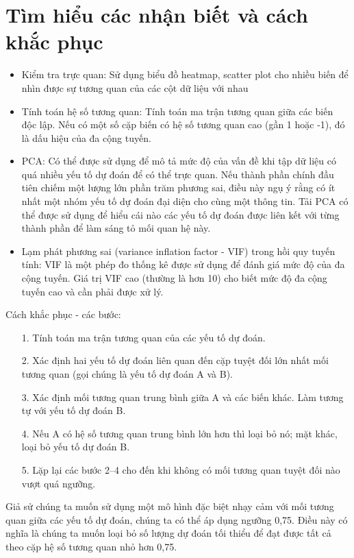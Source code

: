 \documentclass[12pt,a4papers]{article}
\begin{document}
\section{Tìm hiểu các nhận biết và cách khắc phục}
\begin{itemize}
    \item Kiểm tra trực quan: Sử dụng biểu đồ heatmap, scatter plot cho nhiều biến để nhìn được sự tương quan của các cột dữ liệu với nhau
    \item Tính toán hệ số tương quan: Tính toán ma trận tương quan giữa các biến độc lập. Nếu có một số cặp biến có hệ số tương quan cao (gần 1 hoặc -1), đó là dấu hiệu của đa cộng tuyến.
    \item PCA: Có thể được sử dụng để mô tả mức độ của vấn đề khi tập dữ liệu có quá nhiều yếu tố dự đoán để có thể trực quan. Nếu thành phần chính đầu tiên chiếm một lượng lớn phần trăm phương sai, điều này ngụ ý rằng có ít nhất một nhóm yếu tố dự đoán đại diện cho cùng một thông tin. Tải PCA có thể được sử dụng để hiểu cái nào
các yếu tố dự đoán được liên kết với từng thành phần để làm sáng tỏ mối quan hệ này.
    \item Lạm phát phương sai (variance inflation factor - VIF) trong hồi quy tuyến tính: VIF là một phép đo thống kê được sử dụng để đánh giá mức độ của đa cộng tuyến. Giá trị VIF cao (thường là hơn 10) cho biết mức độ đa cộng tuyến cao và cần phải được xử lý.
\end{itemize}

Cách khắc phục - các bước:
\begin{itemize}
    \item[1.] Tính toán ma trận tương quan của các yếu tố dự đoán.
    \item[2.] Xác định hai yếu tố dự đoán liên quan đến cặp tuyệt đối lớn nhất
mối tương quan (gọi chúng là yếu tố dự đoán A và B).
    \item[3.] Xác định mối tương quan trung bình giữa A và các biến khác.
Làm tương tự với yếu tố dự đoán B.
    \item[4.] Nếu A có hệ số tương quan trung bình lớn hơn thì loại bỏ nó; mặt khác, loại bỏ yếu tố dự đoán B.
    \item[5.] Lặp lại các bước 2–4 cho đến khi không có mối tương quan tuyệt đối nào vượt quá ngưỡng.
\end{itemize}

Giả sử chúng ta muốn sử dụng một mô hình đặc biệt nhạy cảm với mối tương quan giữa các yếu tố dự đoán, chúng ta có thể áp dụng ngưỡng 0,75. Điều này có nghĩa là chúng ta
muốn loại bỏ số lượng dự đoán tối thiểu để đạt được tất cả theo cặp
hệ số tương quan nhỏ hơn 0,75.
\end{document}
